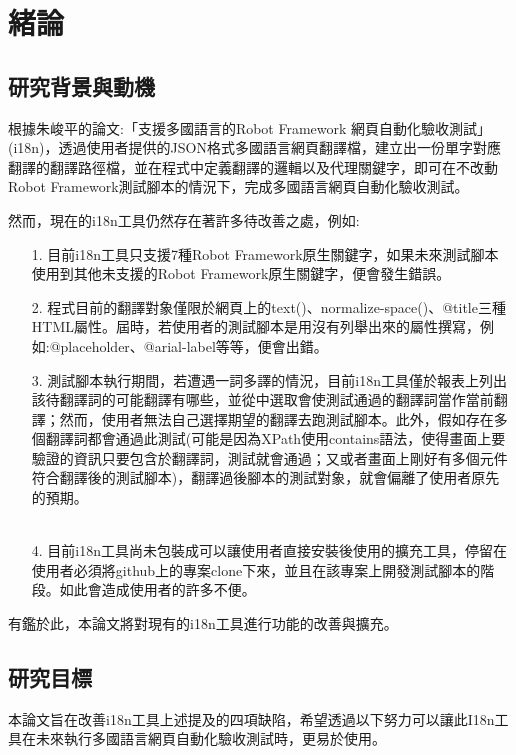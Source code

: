 \chapter{緒論}

\section{研究背景與動機}
根據朱峻平的論文:「支援多國語言的Robot Framework 網頁自動化驗收測試」(i18n)\cite{i18n}，透過使用者提供的JSON格式\cite{json}多國語言網頁翻譯檔，建立出一份單字對應翻譯的翻譯路徑檔，並在程式中定義翻譯的邏輯以及代理關鍵字，即可在不改動Robot Framework測試腳本的情況下，完成多國語言網頁自動化驗收測試。

然而，現在的i18n\cite{internationalization}工具仍然存在著許多待改善之處，例如: 

\begin{itemize}
\item[1.] 目前i18n工具只支援7種Robot Framework\cite{rf}原生關鍵字，如果未來測試腳本使用到其他未支援的Robot Framework原生關鍵字，便會發生錯誤。
\item[2.] 程式目前的翻譯對象僅限於網頁上的text()、normalize-space()、@title三種HTML屬性。屆時，若使用者的測試腳本是用沒有列舉出來的屬性撰寫，例如:@placeholder、@arial-label等等，便會出錯。
\item[3.] 測試腳本執行期間，若遭遇一詞多譯的情況，目前i18n工具僅於報表上列出該待翻譯詞的可能翻譯有哪些，並從中選取會使測試通過的翻譯詞當作當前翻譯；然而，使用者無法自己選擇期望的翻譯去跑測試腳本。此外，假如存在多個翻譯詞都會通過此測試(可能是因為XPath\cite{xpath}\cite{stablexpath}使用contains語法，使得畫面上要驗證的資訊只要包含於翻譯詞，測試就會通過；又或者畫面上剛好有多個元件符合翻譯後的測試腳本)，翻譯過後腳本的測試對象，就會偏離了使用者原先的預期。
\\ \hspace*{\fill} \\ 
\item[4.] 目前i18n工具尚未包裝成可以讓使用者直接安裝後使用的擴充工具，停留在使用者必須將github上的專案clone下來，並且在該專案上開發測試腳本的階段。如此會造成使用者的許多不便。
\end{itemize}

有鑑於此，本論文將對現有的i18n工具進行功能的改善與擴充。

\section{研究目標}
本論文旨在改善i18n工具上述提及的四項缺陷，希望透過以下努力可以讓此I18n工具在未來執行多國語言網頁自動化驗收測試\cite{se}\cite{testduo}時，更易於使用。

